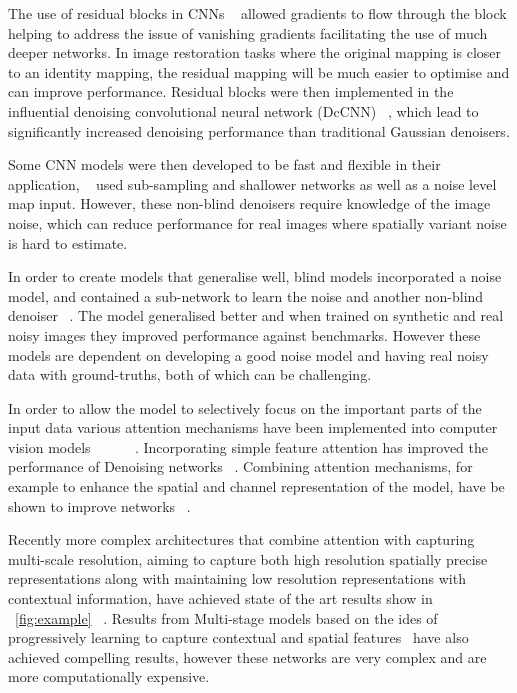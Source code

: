 \documentclass[project-plan]{report-template}
\begin{document}
The use of residual blocks in CNNs ~\cite{he2015DeepRL} allowed gradients to flow through the block helping to address the issue of vanishing gradients facilitating the use of much deeper networks. In image restoration tasks where the original mapping is closer to an identity mapping, the residual mapping will be much easier to optimise and can improve performance. Residual blocks were then implemented in the influential denoising convolutional neural network (DcCNN) ~\cite{zhang2017beyond}, which lead to significantly increased denoising performance than traditional Gaussian denoisers. 

Some CNN models were then developed to be fast and flexible in their application, ~\cite{zhang2018ffdnet} used sub-sampling and shallower networks as well as a noise level map input. However, these non-blind denoisers require knowledge of the image noise, which can reduce performance for real images where spatially variant noise is hard to estimate.  

In order to create models that generalise well, blind models incorporated a noise model, and contained a sub-network to learn the noise and another non-blind denoiser ~\cite{Guo2019Cbdnet}. The model generalised better and when trained on synthetic and real noisy images they improved performance against benchmarks. However these models are dependent on developing a good noise model and having real noisy data with ground-truths, both of which can be challenging.

In order to allow the model to selectively focus on the important parts of the input data various attention mechanisms have been implemented into computer vision models ~\cite{wang2017residual} ~\cite{hu2018senet}~\cite{woo2018cbam}~\cite{wang2020eca}~\cite{hou2021coordinate}. Incorporating simple feature attention has improved the performance of Denoising networks ~\cite{anwar2019rid}. Combining attention mechanisms, for example to enhance the spatial and channel representation of the model, have be shown to improve networks ~\cite{cai2023cbamdncnn}.

Recently more complex architectures that combine attention with capturing multi-scale resolution, aiming to capture both high resolution spatially precise representations along with maintaining low resolution representations with contextual information, have achieved state of the art results show in ~\ref{fig:example} ~\cite{zamir2020MIRNet}. Results from Multi-stage models based on the ides of progressively learning to capture contextual and spatial features~\cite{zamir2021MPRNet} have also achieved compelling results, however these networks are very complex and are more computationally expensive.
\end{document}
